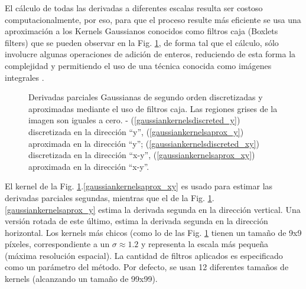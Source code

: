 \documentclass[a4paper,11pt,spanish]{article}
\begin{document}
El cálculo de todas las derivadas a diferentes escalas resulta ser costoso computacionalmente, por eso, para que el proceso resulte más eficiente se usa una aproximación a los Kernels Gaussianos conocidos como filtros caja (Boxlets filters) \cite{conf/nips/SimardBHL98} que se pueden observar en la Fig. \ref{gaussiankernels}, de forma tal que el cálculo, sólo involucre algunas operaciones de adición de enteros, reduciendo de esta forma la complejidad y permitiendo el uso de una técnica conocida como imágenes integrales \cite{viola01boosting}.

\begin{figure}[tbhp]
   \centering
	\hspace{0.1\linewidth}
	\hspace{0.1\linewidth}
	\hspace{0.1\linewidth}
	\hspace{0.1\linewidth}
 \caption{Derivadas parciales Gaussianas de segundo orden discretizadas y aproximadas mediante el uso de filtros caja. Las regiones grises de la imagen son iguales a cero. - (\ref{gaussiankernelsdiscreted_y}) discretizada en la dirección ``y'', (\ref{gaussiankernelsaprox_y}) aproximada en la dirección ``y''; (\ref{gaussiankernelsdiscreted_xy}) discretizada en la dirección ``x-y'', (\ref{gaussiankernelsaprox_xy}) aproximada en la dirección ``x-y''. }             %
  \label{gaussiankernels}
\end{figure}

El kernel de la Fig. \ref{gaussiankernels}.\ref{gaussiankernelsaprox_xy} es usado para estimar las derivadas parciales segundas, mientras que el de la Fig. \ref{gaussiankernels}.\ref{gaussiankernelsaprox_y} estima la derivada segunda en la dirección vertical. Una versión rotada de este último, estima la derivada segunda en la dirección horizontal. Los kernels más chicos (como lo de las Fig. \ref{gaussiankernels} tienen un tamaño de 9x9 píxeles, correspondiente a un $\sigma \approx 1.2$ y representa la escala más pequeña (máxima resolución espacial). %
La cantidad de filtros aplicados es especificado como un parámetro del método. Por defecto, se usan 12 diferentes tamaños de kernels (alcanzando un tamaño de 99x99). %
\end{document}
